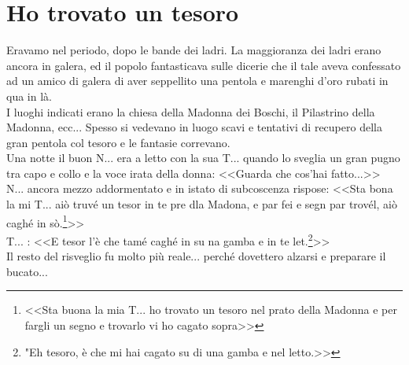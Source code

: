 
\chapter{Ho trovato un tesoro}

Eravamo nel periodo, dopo le bande dei ladri. La maggioranza dei ladri erano ancora in galera, ed il popolo fantasticava sulle dicerie che il tale aveva confessato ad un amico di galera di aver seppellito una pentola e marenghi d'oro rubati in qua in là.\\
\indent I luoghi indicati erano la chiesa della Madonna dei Boschi, il Pilastrino della Madonna, ecc... Spesso si vedevano in luogo scavi e tentativi di recupero della gran pentola col tesoro e le fantasie correvano.\\
\indent Una notte il buon N\:.\:.\:. era a letto con la sua T\:.\:.\:. quando lo sveglia un gran pugno tra capo e collo e la voce irata della donna: <<Guarda che cos'hai fatto...>>\\
\indent {}N\:.\:.\:. ancora mezzo addormentato e in istato di subcoscenza rispose: <<Sta bona la mi T\:.\:.\:. aiò truvé un tesor in te pre dla Madona, e par fei e segn par trovél, aiò caghé in sò.\footnote{<<Sta buona la mia T\:.\:.\:. ho trovato un tesoro nel prato della Madonna e per fargli un segno e trovarlo vi ho cagato sopra>>}>>\\
\indent {}T\:.\:.\:. : <<E tesor l'è che tamé caghé  in su na gamba e in te let.\footnote{"Eh tesoro, è che mi hai cagato su di una gamba e nel letto.>>}>>\\
\indent Il resto del risveglio fu molto più reale... perché dovettero alzarsi e preparare il bucato...


